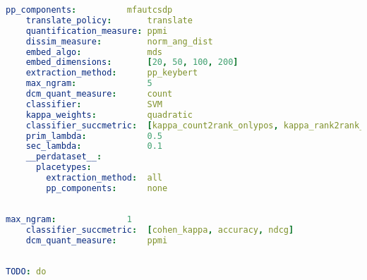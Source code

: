\begin{lstlisting}[language=yaml, caption={YAML for \textcite{Derrac2015}}]
    pp_components:          mfautcsdp
    translate_policy:       translate
    quantification_measure: ppmi
    dissim_measure:         norm_ang_dist
    embed_algo:             mds
    embed_dimensions:       [20, 50, 100, 200]
    extraction_method:      pp_keybert
    max_ngram:              5                   
    dcm_quant_measure:      count
    classifier:             SVM
    kappa_weights:          quadratic
    classifier_succmetric:  [kappa_count2rank_onlypos, kappa_rank2rank_onlypos_min] 
    prim_lambda:            0.5
    sec_lambda:             0.1
    __perdataset__:
      placetypes:
        extraction_method:  all 
        pp_components:      none
\end{lstlisting}

\subsection{\textcite{Ager2018}}

\begin{lstlisting}[language=yaml, caption={YAML for \textcite{Ager2018}}]
    max_ngram:              1
    classifier_succmetric:  [cohen_kappa, accuracy, ndcg]
    dcm_quant_measure:      ppmi    
\end{lstlisting}


\subsection{\textcite{Alshaikh2020}}

\begin{lstlisting}[language=yaml, caption={YAML for \textcite{Alshaikh2020}}]
    TODO: do
\end{lstlisting}